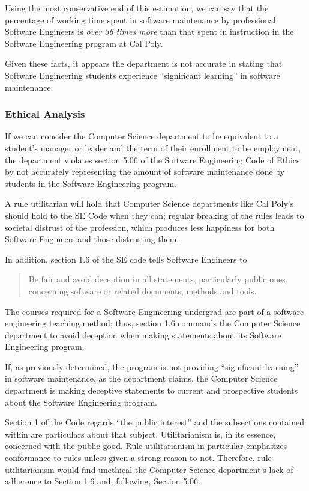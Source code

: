 \documentclass[11pt]{article}
\begin{document}
\begin{multicols}{2}
Using the most conservative end of this estimation, we can say that the percentage of working time spent in software maintenance by professional Software Engineers is \emph{over 36 times more} than that spent in instruction in the Software Engineering program at Cal Poly.

Given these facts, it appears the department is not accurate in stating that Software Engineering students experience ``significant learning'' in software maintenance.

\subsubsection{Ethical Analysis}

If we can consider the Computer Science department to be equivalent to a student's manager or leader and the term of their enrollment to be employment, the department violates section 5.06 of the Software Engineering Code of Ethics by not accurately representing the amount of software maintenance done by students in the Software Engineering program.

A rule utilitarian will hold that Computer Science departments like Cal Poly's should hold to the SE Code when they can; regular breaking of the rules leads to societal distrust of the profession, which produces less happiness for both Software Engineers and those distrusting them.

In addition, section 1.6 of the SE code tells Software Engineers to

\begin{quote}
Be fair and avoid deception in all statements, particularly public ones, concerning software or related documents, methods and tools. \cite{secode}
\end{quote}

The courses required for a Software Engineering undergrad are part of a software engineering teaching method; thus, section 1.6 commands the Computer Science department to avoid deception when making statements about its Software Engineering program.

If, as previously determined, the program is not providing ``significant learning'' in software maintenance, as the department claims, the Computer Science department is making deceptive statements to current and prospective students about the Software Engineering program.

Section 1 of the Code regards ``the public interest'' and the subsections contained within are particulars about that subject. \cite{secode}  Utilitarianism is, in its essence, concerned with the public good. \cite{utilitarianism}  Rule utilitarianism in particular emphasizes conformance to rules unless given a strong reason to not.  Therefore, rule utilitarianism would find unethical the Computer Science department's lack of adherence to Section 1.6 and, following, Section 5.06.



\end{multicols}
\end{document}
